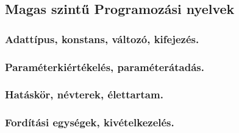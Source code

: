 \subsection{Magas szintű Programozási nyelvek}
\subsubsection{Adattípus, konstans, változó, kifejezés.}

\subsubsection{Paraméterkiértékelés, paraméterátadás.}

\subsubsection{Hatáskör, névterek, élettartam. }

\subsubsection{Fordítási egységek, kivételkezelés.}
